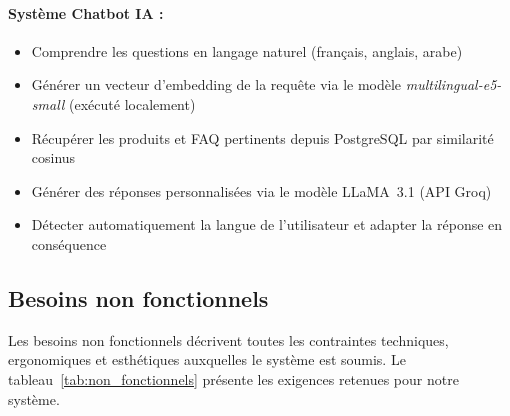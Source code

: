 \paragraph{Système Chatbot IA :}
\begin{itemize}
    \item Comprendre les questions en langage naturel (français, anglais, arabe)
    \item Générer un vecteur d'embedding de la requête via le modèle
          \textit{multilingual-e5-small} (exécuté localement)
    \item Récupérer les produits et FAQ pertinents depuis PostgreSQL par similarité cosinus
    \item Générer des réponses personnalisées via le modèle LLaMA~3.1 (API Groq)
    \item Détecter automatiquement la langue de l'utilisateur et adapter la réponse
          en conséquence
\end{itemize}

\subsection{Besoins non fonctionnels}

Les besoins non fonctionnels décrivent toutes les contraintes techniques, ergonomiques et
esthétiques auxquelles le système est soumis. Le tableau~\ref{tab:non_fonctionnels} présente
les exigences retenues pour notre système.

